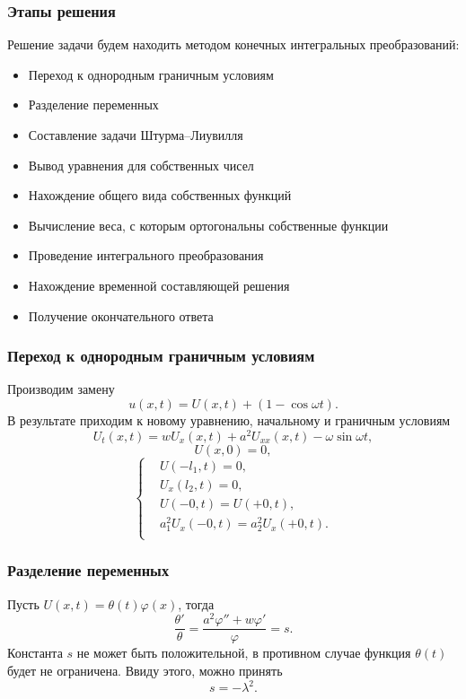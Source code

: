 \documentclass[10pt,pdf,hyperref={unicode}]{beamer}
\begin{document}
\begin{frame}
  \frametitle{Этапы решения}
  Решение задачи будем находить методом конечных интегральных преобразований:
  \begin{itemize}
    \item Переход к однородным граничным условиям
    \item Разделение переменных
    \item Составление задачи Штурма--Лиувилля
    \item Вывод уравнения для собственных чисел
    \item Нахождение общего вида собственных функций
    \item Вычисление веса, с которым ортогональны собственные функции
    \item Проведение интегрального преобразования
    \item Нахождение временной составляющей решения
    \item Получение окончательного ответа
  \end{itemize}
\end{frame}

\begin{frame}
  \frametitle{Переход к однородным граничным условиям} 
  Производим замену
  \begin{equation*}
    u(x,t) = U(x,t) + (1 - \cos \omega t).
  \end{equation*}
  В результате приходим к новому уравнению, начальному и граничным условиям
  \begin{equation*}
    U_t(x,t) = w U_x(x,t) + a^2 U_{xx}(x,t) - \omega\sin\omega t,
  \end{equation*}
  \begin{equation*}
    U(x,0) = 0,
  \end{equation*}
  \begin{equation*}
    \left\{
    \begin{aligned}
      & U(-l_1,t) = 0, \\
      & U_x(l_2,t) = 0, \\
      & U(-0, t) = U(+0, t), \\
      & a_1^2 U_{x}(-0, t) = a_2^2 U_{x}(+0, t). \\
    \end{aligned}
    \right.
  \end{equation*}
\end{frame}

\begin{frame}
  \frametitle{Разделение переменных}
  Пусть $ U(x,t)=\theta(t)\varphi(x) $, тогда
  \begin{equation*}
    \frac{\theta'}{\theta}=\frac{a^2\varphi''+w\varphi'}{\varphi}=s.
    \label{eq:1}
  \end{equation*}
  Константа $ s $ не может быть положительной, в противном случае функция $\theta(t)$ будет не ограничена. Ввиду этого, можно принять
  \begin{equation*}
    s=-\lambda^2.
    \label{eq:2}
  \end{equation*}
\end{frame}
\end{document}
